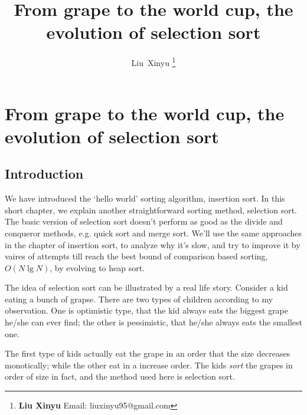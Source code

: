 \documentclass{article}
\begin{document}
\fi


\title{From grape to the world cup, the evolution of selection sort}

\author{Liu~Xinyu
\thanks{{\bfseries Liu Xinyu } \newline
  Email: liuxinyu95@gmail.com \newline}
  }


\maketitle

\ifx\wholebook\relax
\chapter{From grape to the world cup, the evolution of selection sort}
\fi

\section{Introduction}
\label{introduction} 
We have introduced the `hello world' sorting algorithm, insertion
sort. In this short chapter, we explain another straightforward
sorting method, selection sort. The basic version of
selection sort doesn't perform as good as the divide and conqueror
methods, e.g. quick sort and merge sort. We'll use
the same approaches in the chapter of insertion sort, to 
analyze why it's slow, and try to improve it by vaires of
attempts till reach the best bound of comparison
based sorting, $O(N \lg N)$, by evolving to heap sort.

The idea of selection sort can be illustrated by a real life
story. Consider a kid eating a bunch of grapse. There are two
types of children according to my observation. One is optimistic
type, that the kid always eats the biggest grape he/she can ever
find; the other is pessimistic, that he/she always eats the
smallest one.

The first type of kids actually eat the grape in an order that
the size decreases monotically; while the other eat in a increase
order. The kids {\em sort} the grapes in order of size in fact,
and the method used here is selection sort.
\end{document}
